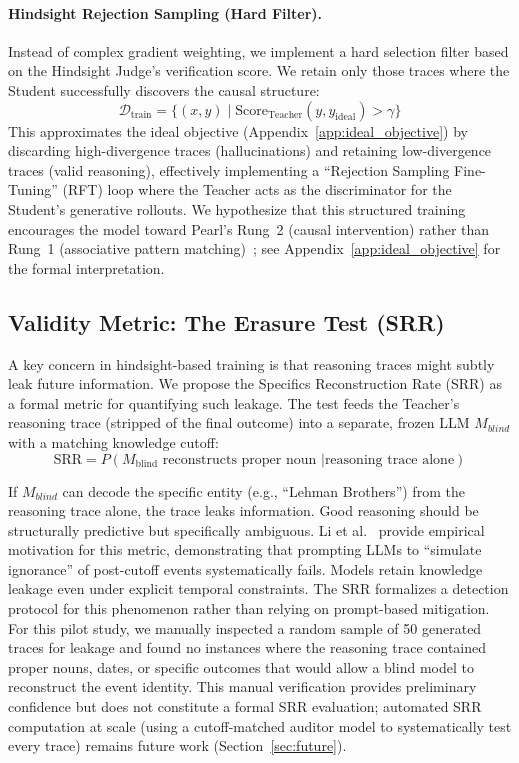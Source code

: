 \documentclass[11pt,a4paper]{article}
\begin{document}
\paragraph{Hindsight Rejection Sampling (Hard Filter).}
Instead of complex gradient weighting, we implement a hard selection filter based on the Hindsight Judge's verification score. We retain only those traces where the Student successfully discovers the causal structure:
\begin{equation}
    \mathcal{D}_{\text{train}} = \{ (x, y) \mid \text{Score}_{\text{Teacher}}(y, y_{\text{ideal}}) > \gamma \}
    \label{eq:filter}
\end{equation}
This approximates the ideal objective (Appendix~\ref{app:ideal_objective}) by discarding high-divergence traces (hallucinations) and retaining low-divergence traces (valid reasoning), effectively implementing a ``Rejection Sampling Fine-Tuning'' (RFT) loop where the Teacher acts as the discriminator for the Student's generative rollouts. We hypothesize that this structured training encourages the model toward Pearl's Rung~2 (causal intervention) rather than Rung~1 (associative pattern matching)~\cite{pearl2009causality}; see Appendix~\ref{app:ideal_objective} for the formal interpretation.

\subsection{Validity Metric: The Erasure Test (SRR)}
\label{sec:srr}

A key concern in hindsight-based training is that reasoning traces might subtly leak future information. We propose the Specifics Reconstruction Rate (SRR) as a formal metric for quantifying such leakage. The test feeds the Teacher's reasoning trace (stripped of the final outcome) into a separate, frozen LLM $M_{blind}$ with a matching knowledge cutoff:
\begin{equation}
    \text{SRR} = P(M_{\text{blind}} \text{ reconstructs proper noun } | \text{reasoning trace alone})
    \label{eq:srr}
\end{equation}

If $M_{blind}$ can decode the specific entity (e.g., ``Lehman Brothers'') from the reasoning trace alone, the trace leaks information. Good reasoning should be structurally predictive but specifically ambiguous. Li et al.~\cite{li2026simulated} provide empirical motivation for this metric, demonstrating that prompting LLMs to ``simulate ignorance'' of post-cutoff events systematically fails. Models retain knowledge leakage even under explicit temporal constraints. The SRR formalizes a detection protocol for this phenomenon rather than relying on prompt-based mitigation. For this pilot study, we manually inspected a random sample of 50 generated traces for leakage and found no instances where the reasoning trace contained proper nouns, dates, or specific outcomes that would allow a blind model to reconstruct the event identity. This manual verification provides preliminary confidence but does not constitute a formal SRR evaluation; automated SRR computation at scale (using a cutoff-matched auditor model to systematically test every trace) remains future work (Section~\ref{sec:future}).
\end{document}

